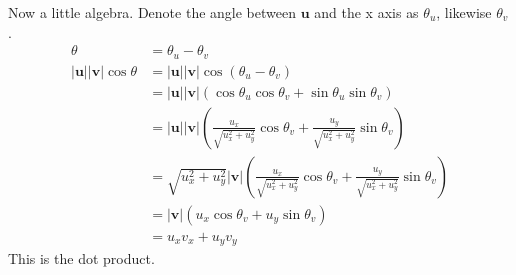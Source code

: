 \documentclass{article}
\renewcommand{\vec}[1]{\boldsymbol{#1}}
\begin{document}
Now a little algebra. Denote the angle between $\vec u$ and the x axis
as $\theta_u$, likewise $\theta_v$. 
\begin{align*}
    \theta &= \theta_u - \theta_v\\
    |\vec u| |\vec v| \cos \theta 
    &= |\vec u| |\vec v| \cos (\theta_u - \theta_v)\\
    &= |\vec u| |\vec v| (\cos\theta_u\cos\theta_v + \sin\theta_u\sin\theta_v)\\
    &= |\vec u| |\vec v| \left(\frac{u_x}{\sqrt{u_x^2+u_y^2}}\cos\theta_v 
        + \frac{u_y}{\sqrt{u_x^2+u_y^2}}\sin\theta_v\right)\\
    &= \sqrt{u_x^2+u_y^2} |\vec v| \left(\frac{u_x}{\sqrt{u_x^2+u_y^2}}\cos\theta_v 
        + \frac{u_y}{\sqrt{u_x^2+u_y^2}}\sin\theta_v\right)\\
    &= |\vec v| \left(u_x\cos\theta_v 
        + u_y\sin\theta_v\right)\\
    &= u_x v_x + u_y v_y
\end{align*}
This is the dot product.
\end{document}
